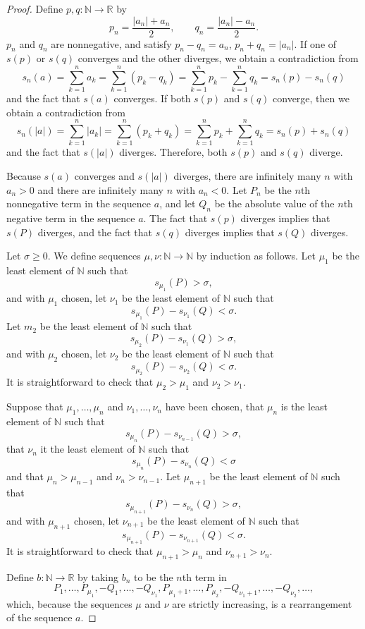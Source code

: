 \documentclass{article}
\begin{document}
\begin{proof}
Define $p,q:\mathbb{N} \to \mathbb{R}$ by
\[
p_n = \frac{|a_n|+a_n}{2}, \qquad q_n = \frac{|a_n|-a_n}{2}.
\]
$p_n$ and $q_n$ are nonnegative, and satisfy $p_n-q_n = a_n$, $p_n+q_n=|a_n|$. 
If one of $s(p)$ or $s(q)$ converges and the other diverges, we obtain a contradiction from
\[
s_n(a)=\sum_{k=1}^n a_k = \sum_{k=1}^n (p_k-q_k) = \sum_{k=1}^n p_k - \sum_{k=1}^n q_k=s_n(p)-s_n(q)
\]
and the fact that $s(a)$ converges.
If both $s(p)$ and $s(q)$ converge, then we obtain a contradiction from
\[
s_n(|a|)=\sum_{k=1}^n |a_k| = \sum_{k=1}^n (p_k+q_k) = \sum_{k=1}^n p_k + \sum_{k=1}^n q_k = s_n(p)+s_n(q)
\] 
and the fact that $s(|a|)$ diverges. Therefore, both $s(p)$ and $s(q)$ diverge.

Because $s(a)$ converges and $s(|a|)$ diverges, there are infinitely many $n$ with $a_n>0$ and there are infinitely many $n$ with
$a_n<0$. Let $P_n$ be the $n$th nonnegative term in the sequence $a$, and let $Q_n$ be the absolute value of the $n$th negative term
in the sequence $a$. 
The fact that $s(p)$ diverges  implies that  $s(P)$ diverges, and the fact that $s(q)$ diverges implies that $s(Q)$ diverges.

Let $\sigma\geq 0$. We define sequences $\mu,\nu:\mathbb{N} \to \mathbb{N}$ by induction
as follows.
Let $\mu_1$ be  the least element of $\mathbb{N}$ such that
\[
s_{\mu_1}(P) >\sigma,
\]
and with $\mu_1$ chosen, let $\nu_1$ be the least element of $\mathbb{N}$ such that 
\[
s_{\mu_1}(P)-s_{\nu_1}(Q)<\sigma.
\]
Let $m_2$ be the least element of $\mathbb{N}$ such that
\[
s_{\mu_2}(P)-s_{\nu_1}(Q)>\sigma,
\]
and with $\mu_2$ chosen, let $\nu_2$ be the least element of $\mathbb{N}$ such that
\[
s_{\mu_2}(P)-s_{\nu_2}(Q)<\sigma.
\]
It is straightforward to check that $\mu_2>\mu_1$ and $\nu_2>\nu_1$.

Suppose that $\mu_1,\ldots,\mu_n$ and $\nu_1,\ldots,\nu_n$ have been chosen,
that $\mu_n$ is the least element of $\mathbb{N}$ such that
\[
s_{\mu_n}(P)-s_{\nu_{n-1}}(Q)>\sigma,
\]
that $\nu_n$ it the least element of $\mathbb{N}$ such that
\[
s_{\mu_n}(P)-s_{\nu_n}(Q)<\sigma
\]
and that
$\mu_n>\mu_{n-1}$ and $\nu_n>\nu_{n-1}$. 
Let $\mu_{n+1}$ be the least element of $\mathbb{N}$ such that
\[
s_{\mu_{n+1}}(P)-s_{\nu_n}(Q)>\sigma,
\]
and with $\mu_{n+1}$ chosen, let $\nu_{n+1}$ be the least element of $\mathbb{N}$ such that
\[
s_{\mu_{n+1}}(P)-s_{\nu_{n+1}}(Q)<\sigma.
\]
It is straightforward to check that $\mu_{n+1} > \mu_n$ and
$\nu_{n+1}>\nu_n$.

Define $b:\mathbb{N} \to \mathbb{R}$ by taking $b_n$ to be the $n$th term in 
\[
P_1,\ldots,P_{\mu_1},-Q_1,\ldots,-Q_{\nu_1},P_{\mu_1+1},\ldots,P_{\mu_2},-Q_{\nu_1+1},\ldots,-Q_{\nu_2},\ldots,
\]
which, because the sequences $\mu$ and $\nu$ are strictly increasing, is a rearrangement of the sequence $a$.


\end{proof}
\end{document}
